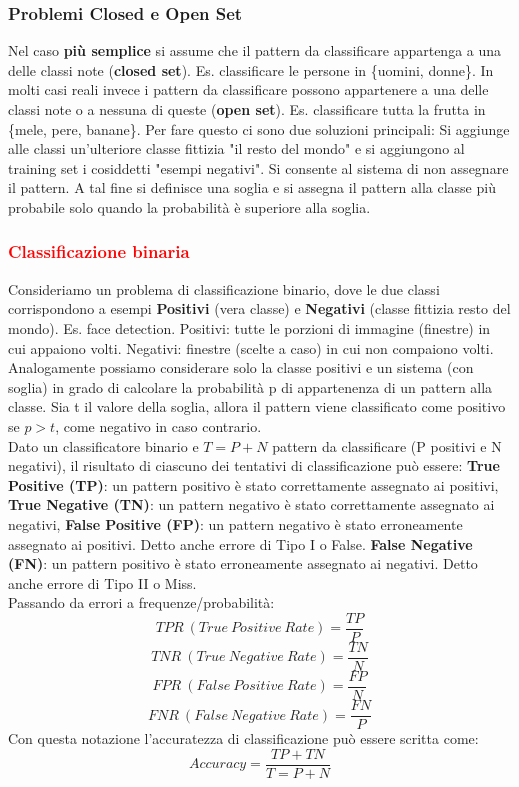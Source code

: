 \documentclass{article}
\begin{document}
\subsubsection{Problemi Closed e Open Set}
Nel caso \textbf{più semplice} si assume che il pattern da classificare appartenga a una delle classi note (\textbf{closed set}). Es. classificare le persone in \{uomini, donne\}. In molti casi reali invece i pattern da classificare possono appartenere a una delle classi note o a nessuna di queste (\textbf{open set}). Es. classificare tutta la frutta in \{mele, pere, banane\}. Per fare questo ci sono due soluzioni principali: Si aggiunge alle classi un'ulteriore classe fittizia "il resto del mondo" e si aggiungono al training set i cosiddetti "esempi negativi". Si consente al sistema di non assegnare il pattern. A tal fine si definisce una soglia e si assegna il pattern alla classe più probabile solo quando la probabilità è superiore alla soglia.
\subsubsection{\textcolor{red} {Classificazione binaria}}
Consideriamo un problema di classificazione binario, dove le due classi corrispondono a esempi \textbf{Positivi} (vera classe) e \textbf{Negativi} (classe fittizia resto del mondo). Es. face detection. Positivi: tutte le porzioni di immagine (finestre) in cui appaiono volti. Negativi: finestre (scelte a caso) in cui non compaiono volti. Analogamente possiamo considerare solo la classe positivi e un sistema (con soglia) in grado di calcolare la probabilità p di appartenenza di un pattern alla classe. Sia t il valore della soglia, allora il pattern viene classificato come positivo se $ p > t$, come negativo in caso contrario. \\
Dato un classificatore binario e $T=P+N$ pattern da classificare (P positivi e N negativi), il risultato di ciascuno dei tentativi di classificazione può essere: \textbf{True Positive (TP)}: un pattern positivo è stato correttamente assegnato ai positivi, \textbf{True Negative (TN)}: un pattern negativo è stato correttamente assegnato ai negativi, \textbf{False Positive (FP)}: un pattern negativo è stato erroneamente assegnato ai positivi. Detto anche errore di Tipo I o False. \textbf{False Negative (FN)}: un pattern positivo è stato erroneamente assegnato ai negativi. Detto anche errore di Tipo II o Miss.\\
Passando da errori a frequenze/probabilità:
$$TPR \ (True \ Positive \ Rate) = \frac{TP}{P}$$
$$TNR \ (True \ Negative \ Rate) = \frac{TN}{N}$$
$$FPR \ (False \ Positive \ Rate) = \frac{FP}{N}$$
$$FNR \ (False \ Negative \ Rate) = \frac{FN}{P}$$
Con questa notazione l'accuratezza di classificazione può essere scritta come: $$Accuracy=\frac{TP+TN}{T=P+N}$$
\end{document}

